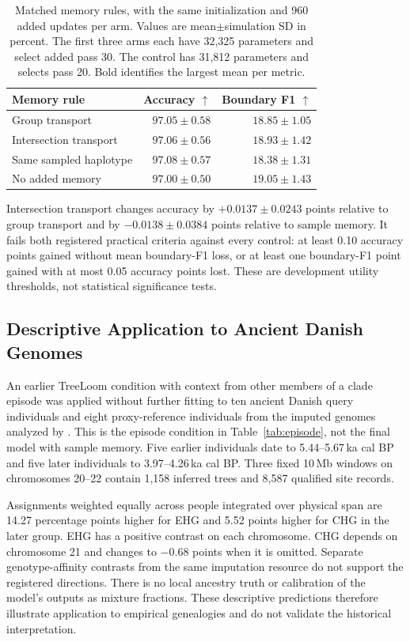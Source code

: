 \documentclass[letterpaper]{article}
\newcommand{\best}[1]{\mathbf{#1}}
\begin{document}
\begin{table}[t]
\centering
\small
\begin{tabular}{@{}lrr@{}}
\toprule
Memory rule & Accuracy $\uparrow$ & Boundary F1 $\uparrow$\\
\midrule
Group transport &$97.05\pm0.58$&$18.85\pm1.05$\\
Intersection transport &$97.06\pm0.56$&$18.93\pm1.42$\\
Same sampled haplotype &$\best{97.08\pm0.57}$&$18.38\pm1.31$\\
No added memory &$97.00\pm0.50$&$\best{19.05\pm1.43}$\\
\bottomrule
\end{tabular}
\caption{Matched memory rules, with the same initialization and 960 added updates per arm. Values are mean$\pm$simulation SD in percent. The first three arms each have 32,325 parameters and select added pass 30. The control has 31,812 parameters and selects pass 20. Bold identifies the largest mean per metric.}
\label{tab:memoryrules}
\end{table}

Intersection transport changes accuracy by $+0.0137\pm0.0243$ points relative to group transport and by $-0.0138\pm0.0384$ points relative to sample memory. It fails both registered practical criteria against every control: at least 0.10 accuracy points gained without mean boundary-F1 loss, or at least one boundary-F1 point gained with at most 0.05 accuracy points lost. These are development utility thresholds, not statistical significance tests.

\subsection{Descriptive Application to Ancient Danish Genomes}
An earlier TreeLoom condition with context from other members of a clade episode was applied without further fitting to ten ancient Danish query individuals and eight proxy-reference individuals from the imputed genomes analyzed by \citet{eurasians2024}. This is the episode condition in Table~\ref{tab:episode}, not the final model with sample memory. Five earlier individuals date to 5.44--5.67\,ka cal BP and five later individuals to 3.97--4.26\,ka cal BP. Three fixed 10\,Mb windows on chromosomes 20--22 contain 1,158 inferred trees and 8,587 qualified site records.

Assignments weighted equally across people integrated over physical span are 14.27 percentage points higher for EHG and 5.52 points higher for CHG in the later group. EHG has a positive contrast on each chromosome. CHG depends on chromosome 21 and changes to $-0.68$ points when it is omitted. Separate genotype-affinity contrasts from the same imputation resource do not support the registered directions. There is no local ancestry truth or calibration of the model's outputs as mixture fractions. These descriptive predictions therefore illustrate application to empirical genealogies and do not validate the historical interpretation.
\end{document}
